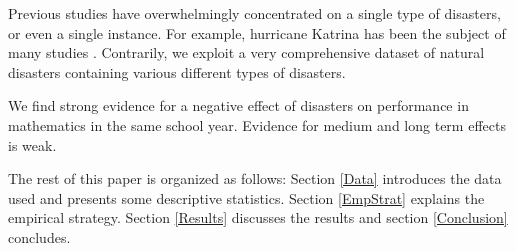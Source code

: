 Previous studies have overwhelmingly concentrated on a single type of disasters, or even a single instance. For example, hurricane Katrina has been the subject of many studies \citep[e.g.][]{Sacerdote_2012, Deryugina_2018}. Contrarily, we exploit a very comprehensive dataset of natural disasters containing various different types of disasters. 

We find strong evidence for a negative effect of disasters on performance in mathematics in the same school year. Evidence for medium and long term effects is weak.

The rest of this paper is organized as follows: Section \ref{Data} introduces the data used and presents some descriptive statistics. Section \ref{EmpStrat} explains the empirical strategy. Section \ref{Results} discusses the results and section \ref{Conclusion} concludes.

